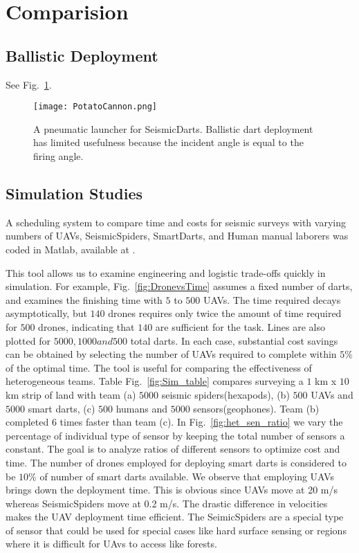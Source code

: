 \section{Comparision}\label{sec:Comparision}

\subsection{Ballistic Deployment}
See Fig.~\ref{fig:TradvsAutoDrop}.

\begin{figure} \centering
  {\texttt{[image: PotatoCannon.png]}}
 \caption{A pneumatic launcher for SeismicDarts.  Ballistic dart deployment has limited usefulness because the incident angle is equal to the firing angle.} 
 \label{fig:TradvsAutoDrop}
\end{figure}



\subsection{Simulation Studies}

A scheduling system to compare  time and costs for seismic surveys with varying numbers of UAVs, SeismicSpiders, SmartDarts, and Human manual laborers was coded in  {\sc Matlab}, available at \cite{Srikanth2016seismicScheduler}.

This tool allows us to examine engineering and logistic trade-offs quickly in simulation.  For example, Fig.~\ref{fig:DronevsTime} assumes a fixed number of darts, and examines the finishing time with $5$ to $500$ UAVs.  The time required decays asymptotically, but $140$ drones requires only twice the amount of time required for $500$ drones, indicating that $140$ are sufficient for the task. Lines are also plotted for $5000, 1000 and 500$ total darts.  In each case, substantial cost savings can be obtained by selecting the number of UAVs required to complete within $5\%$ of the optimal time.
The tool is useful for comparing the effectiveness of heterogeneous teams.  Table Fig.~\ref{fig:Sim_table} compares surveying a $1$ km x $10$ km strip of land with team (a) $5000$ seismic spiders(hexapods), (b) $500$ UAVs and $5000$ smart darts, (c) $500$ humans and $5000$ sensors(geophones).  Team (b) completed $6$ times faster than team (c).
In Fig.~\ref{fig:het_sen_ratio} we vary the percentage of individual type of sensor by keeping the total number of sensors a constant. The goal is to analyze ratios of different sensors to optimize cost and time. The number of drones employed for deploying smart darts is considered to be $10\%$ of number of smart darts available. We observe that employing UAVs brings down the deployment time. This is obvious since UAVs move at 20 m/s whereas SeismicSpiders move at 0.2 m/s. The drastic difference in velocities makes the UAV deployment time efficient. The SeimicSpiders are a special type of sensor that could be used for special cases like hard surface sensing or regions where it is difficult for UAvs to access like forests.

